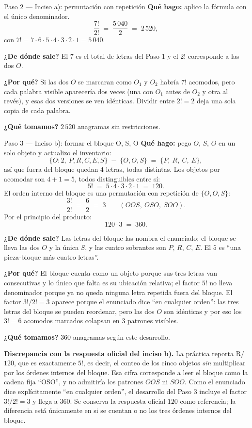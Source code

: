\documentclass[11pt]{article}
\begin{document}
\begin{paso}{Paso 2 --- Inciso a): permutación con repetición}
\textbf{Qué hago:} aplico la fórmula con el único denominador.
\[
\frac{7!}{2!} \;=\; \frac{5\,040}{2} \;=\; 2\,520 ,
\]
con $7!=7\cdot6\cdot5\cdot4\cdot3\cdot2\cdot1=5\,040$.

\textbf{¿De dónde sale?} El $7$ es el total de letras del Paso 1 y el $2!$ corresponde a las dos $O$.

\textbf{¿Por qué?} Si las dos $O$ se marcaran como $O_1$ y $O_2$ habría $7!$ acomodos, pero cada palabra
visible aparecería dos veces (una con $O_1$ antes de $O_2$ y otra al revés), y esas dos versiones se ven
idénticas. Dividir entre $2!=2$ deja una sola copia de cada palabra.

\textbf{¿Qué tomamos?} $2\,520$ anagramas sin restricciones.
\end{paso}

\begin{paso}{Paso 3 --- Inciso b): formar el bloque O, S, O}
\textbf{Qué hago:} pego $O$, $S$, $O$ en un solo objeto y actualizo el inventario:
\[
\{O{:}2,\ P,R,C,E,S\}\;-\;\{O,O,S\} \;=\; \{P,\ R,\ C,\ E\},
\]
así que fuera del bloque quedan $4$ letras, todas distintas. Los objetos por acomodar son
$4+1=5$, todos distinguibles entre sí:
\[
5! \;=\; 5\cdot4\cdot3\cdot2\cdot1 \;=\; 120 .
\]
El orden interno del bloque es una permutación con repetición de $\{O,O,S\}$:
\[
\frac{3!}{2!} \;=\; \frac{6}{2} \;=\; 3 \qquad (OOS,\ OSO,\ SOO).
\]
Por el principio del producto:
\[
120\cdot 3 \;=\; 360 .
\]

\textbf{¿De dónde sale?} Las letras del bloque las nombra el enunciado; el bloque se lleva las dos $O$ y la
única $S$, y las cuatro sobrantes son $P$, $R$, $C$, $E$. El $5$ es ``una pieza-bloque más cuatro letras''.

\textbf{¿Por qué?} El bloque cuenta como un objeto porque sus tres letras van consecutivas y lo único que
falta es su ubicación relativa; el factor $5!$ no lleva denominador porque ya no queda ninguna letra
repetida fuera del bloque. El factor $3!/2!=3$ aparece porque el enunciado dice ``en cualquier orden'': las
tres letras del bloque se pueden reordenar, pero las dos $O$ son idénticas y por eso los $3!=6$ acomodos
marcados colapsan en $3$ patrones visibles.

\textbf{¿Qué tomamos?} $360$ anagramas según este desarrollo.
\end{paso}

\begin{nota}
\textbf{Discrepancia con la respuesta oficial del inciso b).} La práctica reporta R/ $120$, que es
exactamente $5!$, es decir, el conteo de los cinco objetos \emph{sin} multiplicar por los órdenes internos
del bloque. Esa cifra corresponde a leer el bloque como la cadena fija ``OSO'', y no admitiría los patrones
$OOS$ ni $SOO$. Como el enunciado dice explícitamente ``en cualquier orden'', el desarrollo del Paso 3
incluye el factor $3!/2!=3$ y llega a $360$. Se conserva la respuesta oficial $120$ como referencia; la
diferencia está únicamente en si se cuentan o no los tres órdenes internos del bloque.
\end{nota}
\end{document}
